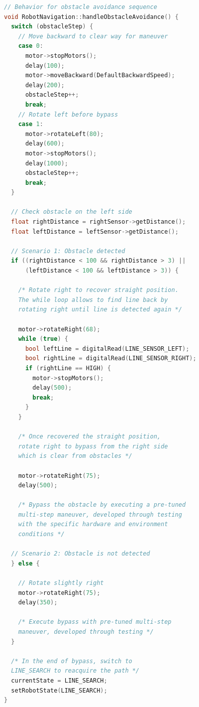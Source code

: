 \documentclass[conference]{IEEEtran}
\begin{document}
\begin{lstlisting}[language=C++, caption=Excerpt from the Obstacle Avoidance Sequence]
// Behavior for obstacle avoidance sequence
void RobotNavigation::handleObstacleAvoidance() {
  switch (obstacleStep) {
    // Move backward to clear way for maneuver
    case 0:
      motor->stopMotors();
      delay(100);
      motor->moveBackward(DefaultBackwardSpeed);
      delay(200);
      obstacleStep++;
      break;
    // Rotate left before bypass
    case 1:
      motor->rotateLeft(80);
      delay(600);
      motor->stopMotors();
      delay(1000);
      obstacleStep++;
      break;
  } 
  
  // Check obstacle on the left side
  float rightDistance = rightSensor->getDistance();
  float leftDistance = leftSensor->getDistance();

  // Scenario 1: Obstacle detected 
  if ((rightDistance < 100 && rightDistance > 3) ||
      (leftDistance < 100 && leftDistance > 3)) {
      
    /* Rotate right to recover straight position.
    The while loop allows to find line back by
    rotating right until line is detected again */
    
    motor->rotateRight(68);
    while (true) {
      bool leftLine = digitalRead(LINE_SENSOR_LEFT);
      bool rightLine = digitalRead(LINE_SENSOR_RIGHT);
      if (rightLine == HIGH) {
        motor->stopMotors();
        delay(500);
        break;
      }
    }
    
    /* Once recovered the straight position, 
    rotate right to bypass from the right side 
    which is clear from obstacles */
    
    motor->rotateRight(75);
    delay(500);
    
    /* Bypass the obstacle by executing a pre-tuned 
    multi-step maneuver, developed through testing 
    with the specific hardware and environment 
    conditions */

  // Scenario 2: Obstacle is not detected 
  } else {
  
    // Rotate slightly right
    motor->rotateRight(75);
    delay(350);
    
    /* Execute bypass with pre-tuned multi-step 
    maneuver, developed through testing */
  }
  
  /* In the end of bypass, switch to 
  LINE_SEARCH to reacquire the path */
  currentState = LINE_SEARCH;
  setRobotState(LINE_SEARCH);
}
\end{lstlisting}
\end{document}

